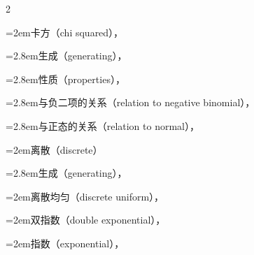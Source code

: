\begin{multicols}{2}
\par\noindent\hangindent=2em\hspace*{1em}\label{idx:280}卡方（chi squared），\hyperref[eq:3.3.10]{\pageref*{eq:3.3.10}}\par
\par\noindent\hangindent=2.8em\hspace*{1.8em}\label{idx:281}生成（generating），\hyperref[eq:5.6.5]{\pageref*{eq:5.6.5}}\par
\par\noindent\hangindent=2.8em\hspace*{1.8em}\label{idx:282}性质（properties），\hyperref[lem:5.3.2]{\pageref*{lem:5.3.2}}\par
\par\noindent\hangindent=2.8em\hspace*{1.8em}\label{idx:283}与负二项的关系（relation to negative binomial），\hyperref[exercise:2.38]{\pageref*{exercise:2.38}}\par
\par\noindent\hangindent=2.8em\hspace*{1.8em}\label{idx:284}与正态的关系（relation to normal），\hyperref[ex:2.1.9]{\pageref*{ex:2.1.9}}\par
{}
\par\noindent\hangindent=2em\hspace*{1em}\label{idx:285}离散（discrete）\par
\par\noindent\hangindent=2.8em\hspace*{1.8em}\label{idx:286}生成（generating），\hyperref[ex:5.6.5]{\pageref*{ex:5.6.5}}\par
\par\noindent\hangindent=2em\hspace*{1em}\label{idx:287}离散均匀（discrete uniform），\hyperref[eq:3.2.1]{\pageref*{eq:3.2.1}}\par
\par\noindent\hangindent=2em\hspace*{1em}\label{idx:288}双指数（double exponential），\hyperref[eq:3.3.23]{\pageref*{eq:3.3.23}}\par
\par\noindent\hangindent=2em\hspace*{1em}\label{idx:289}指数（exponential），\hyperref[eq:3.3.11]{\pageref*{eq:3.3.11}}\par

\end{multicols}
